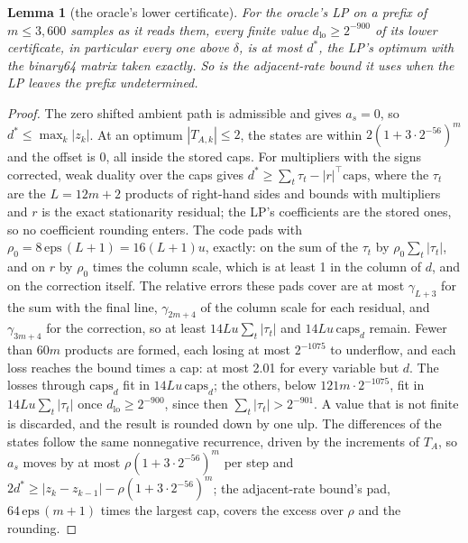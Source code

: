 \documentclass[11pt,a4paper]{article}
\newtheorem{alemma}{Lemma}[section]
\begin{document}
\begin{alemma}[the oracle's lower certificate]\label{lem:olow}
For the oracle's LP on a prefix of $m\le3{,}600$ samples as it reads them, every finite value $d_{\mathrm{lo}}\ge2^{-900}$
of its lower certificate, in particular every one above $\delta$, is at most $d^\ast$, the LP's optimum with the binary64
matrix taken exactly. So is the adjacent-rate bound it uses when the LP leaves the prefix undetermined.
\end{alemma}
\begin{proof}
The zero shifted ambient path is admissible and gives $a_s = 0$, so $d^\ast\le\max_k|z_k|$. At an optimum $|T_{A,k}|\le2$,
the states are within $2(1+3\cdot2^{-56})^{m}$ and the offset is 0, all inside the stored caps. For multipliers with
the signs corrected, weak duality over the caps gives $d^\ast\ge\sum_t\tau_t - |r|^\top\mathrm{caps}$, where the $\tau_t$
are the $L = 12m+2$ products of right-hand sides and bounds with multipliers and $r$ is the exact stationarity residual;
the LP's coefficients are the stored ones, so no coefficient rounding enters. The code pads with
$\rho_0 = 8\,\mathrm{eps}\,(L+1) = 16(L+1)u$, exactly: on the sum of the $\tau_t$ by $\rho_0\sum_t|\tau_t|$, and on $r$
by $\rho_0$ times the column scale, which is at least 1 in the column of $d$, and on the correction itself. The relative
errors these pads cover are at most $\gamma_{L+3}$ for the sum with the final line, $\gamma_{2m+4}$ of the column scale
for each residual, and $\gamma_{3m+4}$ for the correction, so at least $14Lu\sum_t|\tau_t|$ and
$14Lu\,\mathrm{caps}_d$ remain. Fewer than $60m$ products are formed, each losing at most $2^{-1075}$ to underflow, and
each loss reaches the bound times a cap: at most 2.01 for every variable but $d$. The losses through $\mathrm{caps}_d$ fit
in $14Lu\,\mathrm{caps}_d$; the others, below $121m\cdot2^{-1075}$, fit in $14Lu\sum_t|\tau_t|$ once
$d_{\mathrm{lo}}\ge2^{-900}$, since then $\sum_t|\tau_t|>2^{-901}$. A value that is not finite is discarded, and the
result is rounded down by one ulp. The differences of the states follow the same nonnegative recurrence, driven by
the increments of $T_A$, so $a_s$ moves by at most $\rho(1+3\cdot2^{-56})^m$ per step and
$2d^\ast\ge|z_k-z_{k-1}|-\rho(1+3\cdot2^{-56})^m$; the adjacent-rate bound's pad, $64\,\mathrm{eps}\,(m+1)$ times the
largest cap, covers the excess over $\rho$ and the rounding.
\end{proof}
\end{document}
